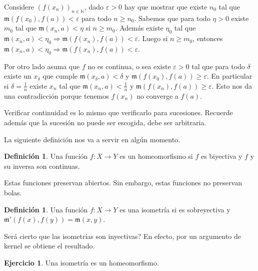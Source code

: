 \documentclass[12pt]{article}
\theoremstyle{plain}
\theoremstyle{definition}
\newtheorem{Def}[Th]{Definición}       %
\newtheorem{Ej}[Th]{Ejercicio}
\theoremstyle{remark}
\numberwithin{equation}{section}
\newcommand{\bN}{\mathbb{N}}        %
\newcommand{\mm}{\mathfrak{m}}      %
\renewcommand{\geq}{\geqslant}      %
\renewcommand{\:}{\colon}           %
\begin{document}
\begin{multicols}{2}
\begin{ptcbp}
Considere $(f(x_n))_{n\in\bN}$, dado $\varepsilon>0$ hay que mostrar que existe $n_0$ tal que $\mm(f(x_0),f(a))<\varepsilon$ para todo $n\geq n_0$. Sabemos que para todo $\eta>0$ existe $m_0$ tal que $\mm(x_n,a)<\eta$ si $n\geq m_0$. Además existe $\eta_0$ tal que $\mm(x_n,a)<\eta_0 \Rightarrow \mm(f(x_n),f(a))<\varepsilon$. Luego si $n\geq m_0$, entonces $\mm(x_n,a)<\eta_0 \Rightarrow \mm(f(x_n),f(a))<\varepsilon$.\par
Por otro lado asuma que $f$ no es continua, o sea existe $\varepsilon>0$ tal que para todo $\delta$ existe un $x_\delta$ que cumple $\mm(x_\delta,a)<\delta$ y $\mm(f(x_0),f(a))\geq\varepsilon$. En particular si $\delta =\frac{1}{n}$ existe $x_n$ tal que $\mm(x_n,a)<\frac{1}{n}$ y $\mm(f(x_n),f(a))\geq \varepsilon$. Esto nos da una contradicción porque tenemos $f(x_n)$ no converge a $f(a)$.
\end{ptcbp}

Verificar continuidad es lo mismo que verificarlo para sucesiones. Recuerde además que la sucesión no puede ser escogida, debe ser arbitraria.\par
La siguiente definición nos va a servir en algún momento.
\begin{Def}
  Una función $f\colon X\to Y$ es un homeomorfismo si $f$ es biyectiva y $f$ y su inversa son continuas.
\end{Def}

Estas funciones preservan abiertos. Sin embargo, estas funciones no preservan bolas.

\begin{Def}
   Una función $f\colon X\to Y$ es una isometría si es sobreyectiva y $\mm'(f(x),f(y))=\mm(x,y)$.
\end{Def}

Será cierto que las isometrías son inyectivas? En efecto, por un argumento de kernel se obtiene el resultado.
\begin{Ej}
  Una isometría es un homeomorfismo.
\end{Ej}


\end{multicols}
\end{document}
